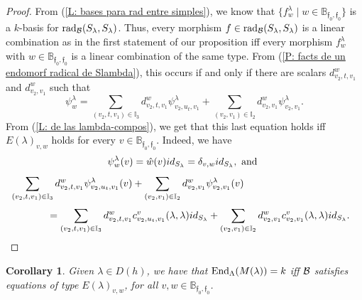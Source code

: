 \documentclass{article}
\newtheorem{corollary}[theorem]{Corollary}
\theoremstyle{definition}
\newcommand{\End}{{ \rm End }}
\newcommand{\rad}{{ \rm rad }}
\renewcommand{\frak}{\mathfrak}
\newcommand{\hueca}[1]{\mathbb{#1}}
\begin{document}
\begin{proof} From (\ref{L: bases para rad entre simples}), we know that 
$\{f_w^\lambda\mid w\in \hueca{B}_{\frak{f}_0,\frak{f}_0}\}$ is a $k$-basis for $\rad_{\cal B}(S_\lambda,S_\lambda)$. Thus, every morphism $f\in \rad_{\cal B}(S_\lambda,S_\lambda)$ is a linear combination as in the first statement of our proposition  iff every morphism $f_w^\lambda$ with $w\in \hueca{B}_{\frak{f}_0,\frak{f}_0}$ is a linear combination of the same type. From (\ref{P: facts de un endomorf radical de Slambda}),  this occurs  if and only if there are scalars  $d^w_{v_2,t,v_1}$ and $d^w_{v_2,v_1}$ such that 
$$\psi^{\lambda}_w=\sum_{(v_2,t,v_1)\in \hueca{I}_3}
d^w_{v_2,t,v_1}\psi^\lambda_{v_2,u_t,v_1}
+
\sum_{(v_2,v_1)\in \hueca{I}_2}d^w_{v_2,v_1}\psi^\lambda_{v_2,v_1}.$$
From (\ref{L: de las lambda-compos}), we get that this last equation holds iff $E(\lambda)_{v,w}$ holds 
for every $v\in \hueca{B}_{\frak{f}_0,\frak{f}_0}$. Indeed, we have 
$$\psi^\lambda_w(v)=\hat{w}(v)id_{S_\lambda}=\delta_{v,w}id_{S_\lambda}, \hbox{ and }$$
\vbox{$$\sum_{(v_2,t,v_1)\in \hueca{I}_3}
d^w_{v_2,t,v_1}\psi^\lambda_{v_2,u_t,v_1}(v)
+
\sum_{(v_2,v_1)\in \hueca{I}_2}d^w_{v_2,v_1}\psi^\lambda_{v_2,v_1}(v)\hbox{\hskip4cm}$$
$$\hbox{\hskip1cm}=\sum_{(v_2,t,v_1)\in \hueca{I}_3}
d^w_{v_2,t,v_1}c^v_{v_2,u_t,v_1}(\lambda,\lambda)id_{S_\lambda}
+
\sum_{(v_2,v_1)\in \hueca{I}_2}
d^w_{v_2,v_1}c^v_{v_2,v_1}(\lambda,\lambda)id_{S_\lambda}.$$}
\end{proof}

\begin{corollary}\label{C: caract de que End(Mlambda)=k casi siempre} Given $\lambda\in D(h)$, we have that $\End_\Lambda(M(\lambda))=k$ iff ${\cal B}$ satisfies equations of type  $E(\lambda)_{v,w}$, for all $v,w\in \hueca{B}_{\frak{f}_0,\frak{f}_0}$. 
\end{corollary}
\end{document}
